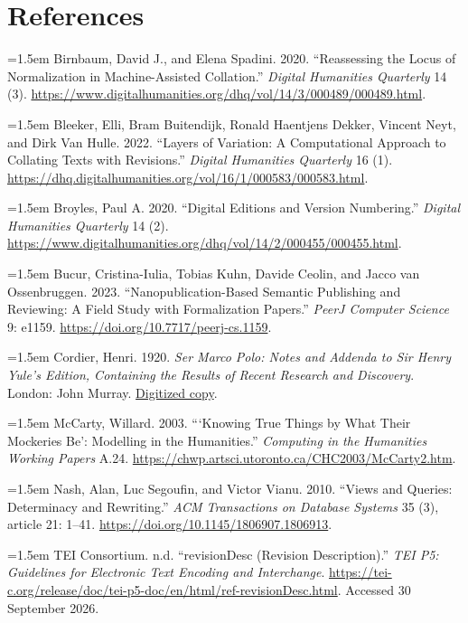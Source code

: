 \documentclass[11pt,a4paper]{article}
\begin{document}
\section*{References}

\begingroup\small\raggedright\setlength{\parindent}{0pt}\setlength{\parskip}{0.35em}

\hangindent=1.5em Birnbaum, David J., and Elena Spadini. 2020. “Reassessing the Locus of Normalization in Machine-Assisted Collation.” \emph{Digital Humanities Quarterly} 14 (3). \url{https://www.digitalhumanities.org/dhq/vol/14/3/000489/000489.html}.


\hangindent=1.5em Bleeker, Elli, Bram Buitendijk, Ronald Haentjens Dekker, Vincent Neyt, and Dirk Van Hulle. 2022. “Layers of Variation: A Computational Approach to Collating Texts with Revisions.” \emph{Digital Humanities Quarterly} 16 (1). \url{https://dhq.digitalhumanities.org/vol/16/1/000583/000583.html}.


\hangindent=1.5em Broyles, Paul A. 2020. “Digital Editions and Version Numbering.” \emph{Digital Humanities Quarterly} 14 (2). \url{https://www.digitalhumanities.org/dhq/vol/14/2/000455/000455.html}.


\hangindent=1.5em Bucur, Cristina-Iulia, Tobias Kuhn, Davide Ceolin, and Jacco van Ossenbruggen. 2023. “Nanopublication-Based Semantic Publishing and Reviewing: A Field Study with Formalization Papers.” \emph{PeerJ Computer Science} 9: e1159. \url{https://doi.org/10.7717/peerj-cs.1159}.


\hangindent=1.5em Cordier, Henri. 1920. \emph{Ser Marco Polo: Notes and Addenda to Sir Henry Yule's Edition, Containing the Results of Recent Research and Discovery}. London: John Murray. \href{https://resources.warburg.sas.ac.uk/pdf/ndb90b2753728.pdf}{Digitized copy}.


\hangindent=1.5em McCarty, Willard. 2003. “‘Knowing True Things by What Their Mockeries Be’: Modelling in the Humanities.” \emph{Computing in the Humanities Working Papers} A.24. \url{https://chwp.artsci.utoronto.ca/CHC2003/McCarty2.htm}.


\hangindent=1.5em Nash, Alan, Luc Segoufin, and Victor Vianu. 2010. “Views and Queries: Determinacy and Rewriting.” \emph{ACM Transactions on Database Systems} 35 (3), article 21: 1–41. \url{https://doi.org/10.1145/1806907.1806913}.


\hangindent=1.5em TEI Consortium. n.d. “revisionDesc (Revision Description).” \emph{TEI P5: Guidelines for Electronic Text Encoding and Interchange}. \url{https://tei-c.org/release/doc/tei-p5-doc/en/html/ref-revisionDesc.html}. Accessed 30 September 2026.
\end{document}
